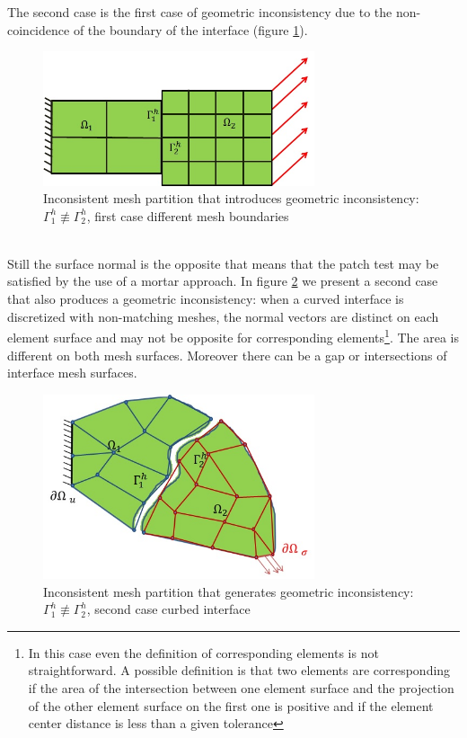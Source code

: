  The second case is the first case of geometric inconsistency due to the non-coincidence of the boundary of the interface (figure \ref{fig.5}).
 \begin{figure}[ht]
 \centering
 \includegraphics[width=8cm]{images/Ch1/Mesh_inconsist_2}
 \caption{Inconsistent mesh partition that introduces geometric inconsistency: $\Gamma_1^{h} \not\equiv  \Gamma_2^{h} $, first case different mesh boundaries} 
 \label{fig.5}
 \end{figure}
  \\
 Still the surface normal is the opposite that means that the patch test may be satisfied by the use of a mortar approach. In figure \ref{fig.6} we present a second case that also produces a geometric inconsistency: when a curved interface is discretized with non-matching meshes, the normal vectors are distinct on each element surface and may not be opposite for corresponding elements\footnote{In this case even the definition of corresponding elements is not straightforward. A possible definition  is that two elements are corresponding if the area of the intersection between one element surface and the projection of the other element surface on the first one is positive and if the element center distance is less than a given tolerance }. The area is different on both mesh surfaces. Moreover there can be a gap or intersections of interface mesh surfaces. 
 \begin{figure}[ht]
 \centering
 \includegraphics[width=8cm]{images/Ch1/Mesh_inconsist_3}
 \caption{Inconsistent mesh partition that generates geometric inconsistency: $\Gamma_1^{h} \not\equiv  \Gamma_2^{h} $, second case curbed interface} 
 \label{fig.6}
 \end{figure}
